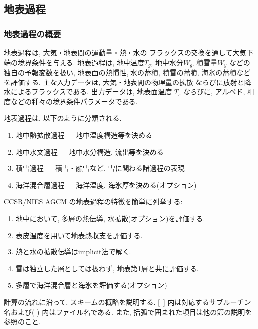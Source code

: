 ﻿
\subsection{地表過程}

\subsubsection{地表過程の概要}

地表過程は, 大気・地表間の運動量・熱・水の
フラックスの交換を通して大気下端の境界条件を与える.
地表過程は, 地中温度$T_g$, 地中水分$W_g$,
積雪量$W_y$ などの独自の予報変数を扱い,
地表面の熱慣性, 水の蓄積, 積雪の蓄積, 
海氷の蓄積などを評価する.
主な入力データは, 大気・地表間の物理量の拡散
ならびに放射と降水によるフラックスである.
出力データは, 地表面温度 $T_s$ ならびに,
アルベド, 粗度などの種々の境界条件パラメータである.

地表過程は, 以下のように分類される.
\begin{enumerate}
  \item 地中熱拡散過程 --- 地中温度構造等を決める
  \item 地中水文過程   ---  地中水分構造, 流出等を決める
  \item 積雪過程        ---  積雪・融雪など, 雪に関わる諸過程の表現
  \item 海洋混合層過程 --- 海洋温度, 海氷厚を決める(オプション)
\end{enumerate}
      
CCSR/NIES AGCM の地表過程の特徴を簡単に列挙する:
\begin{enumerate}
\item 地中において, 多層の熱伝導, 水拡散(オプション)を評価する.
\item 表皮温度を用いて地表熱収支を評価する.
\item 熱と水の拡散伝導はimplicit法で解く.
\item 雪は独立した層としては扱わず, 地表第1層と共に評価する.
\item 多層で海洋混合層と海氷を評価する(オプション)
\end{enumerate}

計算の流れに沿って, スキームの概略を説明する.
[\ ] 内は対応するサブルーチン名および( ) 内はファイル名である.
また, 括弧で囲まれた項目は他の節の説明を参照のこと.

